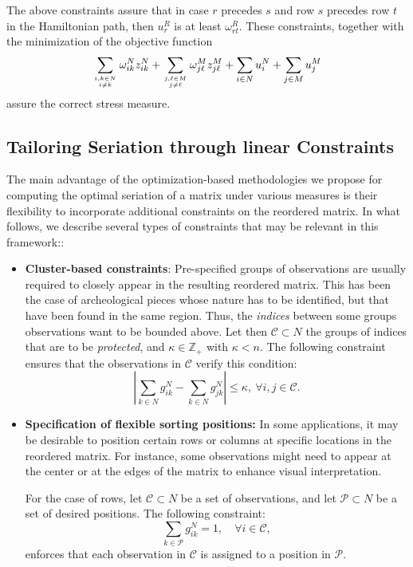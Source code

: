 \documentclass[a4paper,11pt, reqno]{amsart}
\newcommand{\dsum}{\displaystyle\sum}
\def\Z{\mathbb{Z}}
\begin{document}
The above constraints assure that in case $r$ precedes $s$ and row $s$ precedes row $t$ in the Hamiltonian path, then $u^R_r$ is at least $\omega^R_{rt}$. These constraints, together with the minimization of the objective function
$$
\sum_{i,k \in N\atop i\neq k}      \omega^N_{ik} z^N_{ik} + 
\sum_{j,\ell\in M\atop j\neq \ell }\omega^M_{j\ell } z^M_{j\ell} +
\sum_{i \in N} u^N_i + \dsum_{j\in M} u^M_j$$
assure the correct stress measure.

\subsection{Tailoring Seriation through linear Constraints}

The main advantage of the optimization-based methodologies we propose for computing the optimal seriation of a matrix under various measures is their flexibility to incorporate additional constraints on the reordered matrix. In what follows, we describe several types of constraints that may be relevant in this framework::
\begin{itemize}
    \item {\bf Cluster-based constraints}: Pre-specified groups of observations are usually required to closely appear in the resulting reordered matrix. This has been the case of archeological pieces whose nature has to be identified, but that have been found in the same region. Thus, the \emph{indices} between some groups observations want to be bounded above. Let then $\mathcal{C} \subset N$ the groups of indices that are to be \emph{protected}, and $\kappa \in \Z_+$ with $\kappa <n$. The following constraint ensures that the observations in $\mathcal{C}$ verify this condition:
    $$
    \left|\sum_{k\in N} g^N_{ik} - \sum_{k\in N} g^N_{jk}\right| \leq \kappa,\ \forall i, j \in \mathcal{C}.
    $$
    \item \textbf{Specification of flexible sorting positions:} In some applications, it may be desirable to position certain rows or columns at specific locations in the reordered matrix. For instance, some observations might need to appear at the center or at the edges of the matrix to enhance visual interpretation. 

For the case of rows, let $\mathcal{C} \subset N$ be a set of observations, and let $\mathcal{P} \subset N$ be a set of desired positions. The following constraint:
$$
\sum_{k \in \mathcal{P}} g_{ik}^N = 1, \quad \forall i \in \mathcal{C},
$$
enforces that each observation in $\mathcal{C}$ is assigned to a position in $\mathcal{P}$.
\end{itemize}
\end{document}
